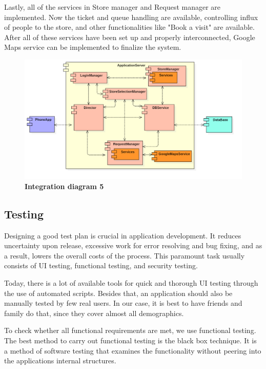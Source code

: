 Lastly, all of the services in Store manager and Request manager are implemented. Now the ticket and queue handling are available, controlling influx of people to the store, and other functionalities like "Book a visit" are available. After all of these services have been set up and properly interconnected, Google Maps service can be implemented to finalize the system.

\begin{figure}[!h]
\centering
\includegraphics[width=\textwidth]{Images/IntegrationDiagram5}
\caption{\label{fig:imp5}\textbf{Integration diagram 5}}
\end{figure} \newpage

\subsection{Testing}

Designing a good test plan is crucial in application development. It reduces uncertainty upon release, excessive work for error resolving and bug fixing, and as a result, lowers the overall costs of the process. This paramount task usually consists of UI testing, functional testing, and security testing. \newline

Today, there is a lot of available tools for quick and thorough UI testing through the use of automated scripts. Besides that, an application should also be manually tested by few real users. In our case, it is best to have friends and family do that, since they cover almost all demographics. 

To check whether all functional requirements are met, we use functional testing. The best method to carry out functional testing is the black box technique.  It is a method of software testing that examines the functionality without peering into the applications internal structures. \newline

